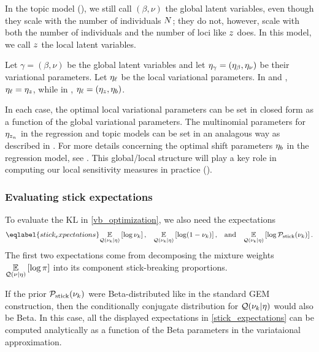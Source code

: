 In the topic model (),
we still call $(\beta, \nu)$ the global latent variables, even though they scale
with the number of individuals $N$;
they do not, however, scale with both the number of individuals and the number of loci
like $z$ does. In this model, we call $z$ the local latent variables.

Let $\gamma = (\beta,\nu)$ be the global latent variables
and let $\eta_{\gamma} = (\eta_{\beta}, \eta_{\nu})$ be their variational parameters.
Let $\eta_{\ell}$ be the local variational parameters. In  and
, $\eta_{\ell} = \eta_{z}$, while
in , $\eta_{\ell} = (\eta_{z}, \eta_b)$.

In each case, the optimal local variational parameters can be set in closed form
as a function of the global variational parameters.
The multinomial parameters for $\eta_{z_n}$ in the regression and topic models
can be set in an analagous way as described in .
For more details concerning the optimal shift parameters $\eta_b$
in the regression model, see .
This global/local structure will play a key role in computing our local sensitivity
measures in practice ().





\subsubsection*{Evaluating stick expectations}

To evaluate the $\mathrm{KL}$ in \eqref{vb_optimization}, we also need
the expectations
\begin{align}\eqlabel{stick_expectations}
%
\expect{\q(\nuk \vert \eta)}{\log \nuk}
\textrm{,}\quad
\expect{\q(\nuk \vert \eta)}{\log (1 - \nuk)}
\textrm{,}\quad\textrm{and}\quad
\expect{\q(\nuk \vert \eta)}{\log \pstick(\nuk)}.
%
\end{align}
The first two expectations come from decomposing the mixture weights
$\underset{\mathcal{Q}(\nu \vert \eta)}{\mathbb{E}}\left[\log \pi\right]$ into its component stick-breaking proportions.

If the prior $\mathcal{P}_{\mathrm{stick}}(\nu_{k})$ were Beta-distributed like in the standard GEM construction,
then the conditionally conjugate distribution for $\mathcal{Q}(\nu_{k} \vert \eta)$ would also be Beta.
In this case, all the displayed expectations in \eqref{stick_expectations}
can be computed analytically as a function of
the Beta parameters in the variataional approximation.

